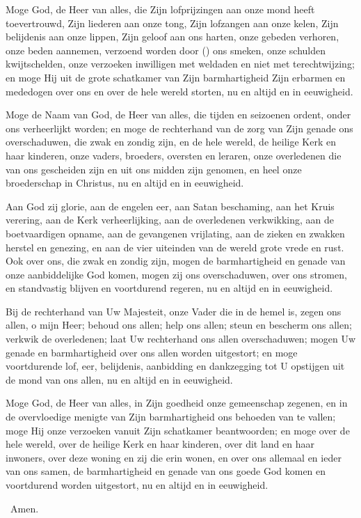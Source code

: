 \documentclass[12pt,twoside,a5paper]{article}
\begin{document}
\begin{halfparskip}
   Moge God, de Heer van alles, die Zijn lofprijzingen aan onze mond heeft toevertrouwd, Zijn liederen aan onze tong, Zijn lofzangen aan onze kelen, Zijn belijdenis aan onze lippen, Zijn geloof aan ons harten, onze gebeden verhoren, onze beden aannemen, verzoend worden door () ons smeken, onze schulden kwijtschelden, onze verzoeken inwilligen met weldaden en niet met terechtwijzing; en moge Hij uit de grote schatkamer van Zijn barmhartigheid Zijn erbarmen en mededogen over ons en over de hele wereld storten, nu en altijd en in eeuwigheid.

   Moge de Naam van God, de Heer van alles, die tijden en seizoenen ordent, onder ons verheerlijkt worden; en moge de rechterhand van de zorg van Zijn genade ons overschaduwen, die zwak en zondig zijn, en de hele wereld, de heilige Kerk en haar kinderen, onze vaders, broeders, oversten en leraren, onze overledenen die van ons gescheiden zijn en uit ons midden zijn genomen, en heel onze broederschap in Christus, nu en altijd en in eeuwigheid.

   Aan God zij glorie, aan de engelen eer, aan Satan beschaming, aan het Kruis verering, aan de Kerk verheerlijking, aan de overledenen verkwikking, aan de boetvaardigen opname, aan de gevangenen vrijlating, aan de zieken en zwakken herstel en genezing, en aan de vier uiteinden van de wereld grote vrede en rust. Ook over ons, die zwak en zondig zijn, mogen de barmhartigheid en genade van onze aanbiddelijke God komen, mogen zij ons overschaduwen, over ons stromen, en standvastig blijven en voortdurend regeren, nu en altijd en in eeuwigheid.

   Bij de rechterhand van Uw Majesteit, onze Vader die in de hemel is, zegen ons allen, o mijn Heer; behoud ons allen; help ons allen; steun en bescherm ons allen; verkwik de overledenen; laat Uw rechterhand ons allen overschaduwen; mogen Uw genade en barmhartigheid over ons allen worden uitgestort; en moge voortdurende lof, eer, belijdenis, aanbidding en dankzegging tot U opstijgen uit de mond van ons allen, nu en altijd en in eeuwigheid.

   Moge God, de Heer van alles, in Zijn goedheid onze gemeenschap zegenen, en in de overvloedige menigte van Zijn barmhartigheid ons behoeden van te vallen; moge Hij onze verzoeken vanuit Zijn schatkamer beantwoorden; en moge over de hele wereld, over de heilige Kerk en haar kinderen, over dit land en haar inwoners, over deze woning en zij die erin wonen, en over ons allemaal en ieder van ons samen, de barmhartigheid en genade van ons goede God komen en voortdurend worden uitgestort, nu en altijd en in eeuwigheid.

  \rr~Amen. 
\end{halfparskip}

\end{document}
